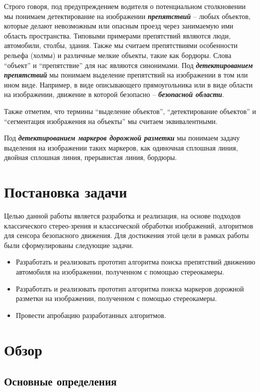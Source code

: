 \documentclass[aps,%
14pt,%
final,%
oneside,
onecolumn,%
musixtex, %
superscriptaddress,%
centertags]{extarticle} %
\begin{document}
 Строго говоря, под предупреждением водителя о потенциальном столкновении мы понимаем детектирование на изображении \textit{\textbf{препятствий}} -- любых объектов, которые делают невозможным или опасным проезд через занимаемую ими область пространства. Типовыми примерами препятствий являются люди, автомобили, столбы, здания. Также мы считаем препятствиями особенности рельефа (холмы) и различные мелкие объекты, такие как бордюры. Слова ``объект'' и ``препятствие'' для нас являются синонимами. Под \textit{\textbf{детектированием препятствий}} мы понимаем выделение препятствий на изображении в том или ином виде. Например, в виде описывающего прямоугольника или в виде области на изображении, движение в которой безопасно -- \textit{\textbf{безопасной области}}.

Также отметим, что термины ``выделение объектов'', ``детектирование объектов'' и ``сегментация изображения на объекты'' мы считаем эквивалентными.

Под \textit{\textbf{детектированием маркеров дорожной разметки}} мы понимаем задачу выделения на изображении таких маркеров, как одиночная сплошная линия, двойная сплошная линия, прерывистая линия, бордюры.

\newpage
\section{Постановка задачи}

Целью данной работы является разработка и реализация, на основе подходов классического стерео-зрения и классической обработки изображений, алгоритмов для сенсора безопасного движения.
Для достижения этой цели в рамках работы были сформулированы следующие задачи.
\begin{itemize}
    \item Разработать и реализовать прототип алгоритма поиска препятствий движению автомобиля на изображении, полученном с помощью стереокамеры.
    \item Разработать и реализовать прототип алгоритма поиска маркеров дорожной разметки на изображении, полученном с помощью стереокамеры.
    \item Провести апробацию разработанных алгоритмов.
\end{itemize}

\newpage
\section{Обзор}

\subsection{Основные определения}
\end{document}

